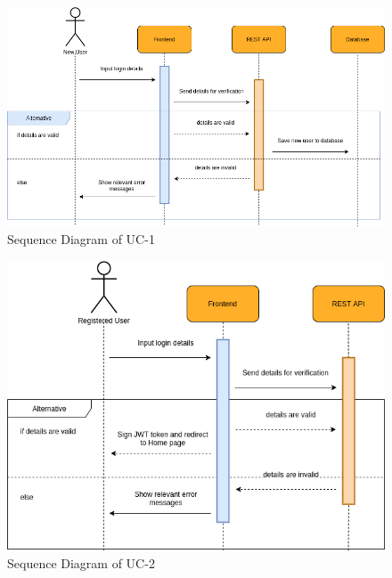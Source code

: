 
        \begin{figure}[H]
            \centering
            \includegraphics[scale=0.5]{./diagrams/sequence/seq-01.png}
            \caption{Sequence Diagram of UC-1}
            \label{fig:seq-01}
            
        \end{figure}
    

        \begin{figure}[H]
            \centering
            \includegraphics[scale=0.5]{./diagrams/sequence/seq-02.png}
            \caption{Sequence Diagram of UC-2}
            \label{fig:seq-02}
            
        \end{figure}
    

